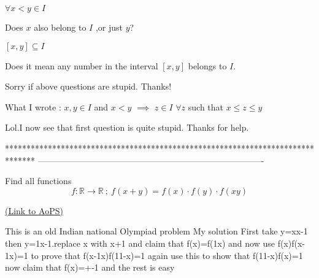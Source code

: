 \begin{solution}
	\begin{tcolorbox}
 $\forall x<y\in I$\end{tcolorbox}
Does $x $ also belong to $I $ ,or just $y $?

\begin{tcolorbox} $[x,y]\subseteq I$\end{tcolorbox}
Does it mean any number in the interval $[x,y] $ belongs to $I $.

Sorry if above questions are stupid.
Thanks!
\end{solution}



\begin{solution}
	What I wrote : $x,y\in I$ and $x<y$ $\implies$ $z\in I$ $\forall z$ such that $x\le z\le y$

\end{solution}



\begin{solution}
	Lol.I now see that first question is quite stupid.
Thanks for help.
\end{solution}
*******************************************************************************
-------------------------------------------------------------------------------

\begin{problem}
	Find all functions 
\[f:\mathbb{R}\rightarrow \mathbb{R} \ ; \ f(x+y)=f(x)\cdot f(y)\cdot f(xy)\]

	\flushright \href{https://artofproblemsolving.com/community/c6h1627540}{(Link to AoPS)}
\end{problem}



\begin{solution}
	This is an old Indian national Olympiad problem
My solution
First take y=x\/x-1 then y=1\/x-1.replace x with x+1 and claim that f(x)=f(1\/x) and now use f(x)f(x-1\/x)=1 to prove that f(x-1\/x)f(1\/1-x)=1 again use this to show that f(1\/1-x)f(x)=1 now claim that f(x)=+-1 and the rest is easy
\end{solution}



